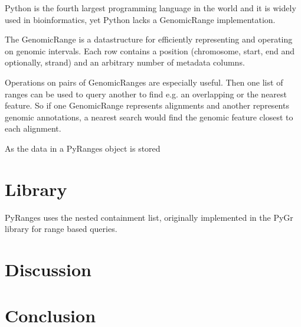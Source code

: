 \documentclass[10pt,letterpaper]{article}
\begin{document}
Python is the fourth largest programming language in the world and it is widely
used in bioinformatics, yet Python lacks a GenomicRange implementation.

The GenomicRange is a datastructure for efficiently representing and operating
on genomic intervals. Each row contains a position (chromosome, start, end and
optionally, strand) and an arbitrary number of metadata columns.

Operations on pairs of GenomicRanges are especially useful. Then one list of
ranges can be used to query another to find e.g. an overlapping or the nearest
feature. So if one GenomicRange represents alignments and another represents
genomic annotations, a nearest search would find the genomic feature closest to
each alignment.

As the data in a PyRanges object is stored



\section*{Library}


PyRanges uses the nested containment list, originally implemented in the PyGr
library \cite{doi:10.1093/bioinformatics/btl647} for range based queries.

\section*{Discussion}

\section*{Conclusion}





\end{document}
